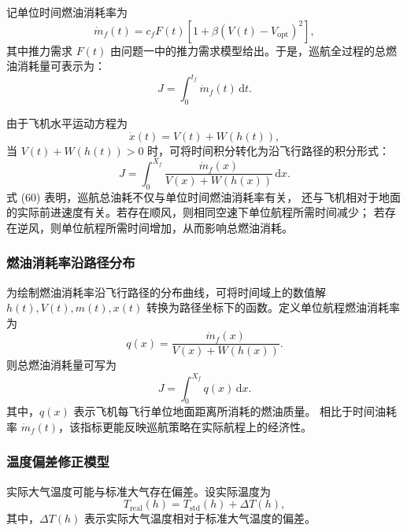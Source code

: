 \documentclass[withoutpreface,bwprint]{cumcmthesis} %
\begin{document}
记单位时间燃油消耗率为
\begin{equation}
    \dot m_f(t)
    =
    c_fF(t)
    \left[
    1+\beta\left(V(t)-V_{\mathrm{opt}}\right)^2
    \right],
    \label{eq:q2_fuel_rate}
\end{equation}
其中推力需求 $F(t)$ 由问题一中的推力需求模型给出。于是，巡航全过程的总燃油消耗量可表示为：
\begin{equation}
    J
    =
    \int_{0}^{t_f}\dot m_f(t)\,\mathrm{d}t.
    \label{eq:q2_total_fuel_time}
\end{equation}

由于飞机水平运动方程为
\begin{equation}
    \dot x(t)=V(t)+W(h(t)),
    \label{eq:q2_xdot}
\end{equation}
当 $V(t)+W(h(t))>0$ 时，可将时间积分转化为沿飞行路径的积分形式：
\begin{equation}
    J
    =
    \int_{0}^{X_f}
    \frac{\dot m_f(x)}{V(x)+W(h(x))}\,\mathrm{d}x.
    \label{eq:q2_total_fuel_path}
\end{equation}
式 (60) 表明，巡航总油耗不仅与单位时间燃油消耗率有关，
还与飞机相对于地面的实际前进速度有关。若存在顺风，则相同空速下单位航程所需时间减少；
若存在逆风，则单位航程所需时间增加，从而影响总燃油消耗。
\subsubsection{燃油消耗率沿路径分布}

为绘制燃油消耗率沿飞行路径的分布曲线，可将时间域上的数值解
$h(t),V(t),m(t),x(t)$ 转换为路径坐标下的函数。定义单位航程燃油消耗率为
\begin{equation}
    q(x)
    =
    \frac{\dot m_f(x)}{V(x)+W(h(x))}.
    \label{eq:q2_fuel_per_distance}
\end{equation}
则总燃油消耗量可写为
\begin{equation}
    J=\int_{0}^{X_f}q(x)\,\mathrm{d}x.
    \label{eq:q2_total_q}
\end{equation}
其中，$q(x)$ 表示飞机每飞行单位地面距离所消耗的燃油质量。
相比于时间油耗率 $\dot m_f(t)$，该指标更能反映巡航策略在实际航程上的经济性。

\subsubsection{温度偏差修正模型}

实际大气温度可能与标准大气存在偏差。设实际温度为
\begin{equation}
    T_{\mathrm{real}}(h)
    =
    T_{\mathrm{std}}(h)+\Delta T(h),
    \label{eq:q2_T_real}
\end{equation}
其中，$\Delta T(h)$ 表示实际大气温度相对于标准大气温度的偏差。
\end{document}
